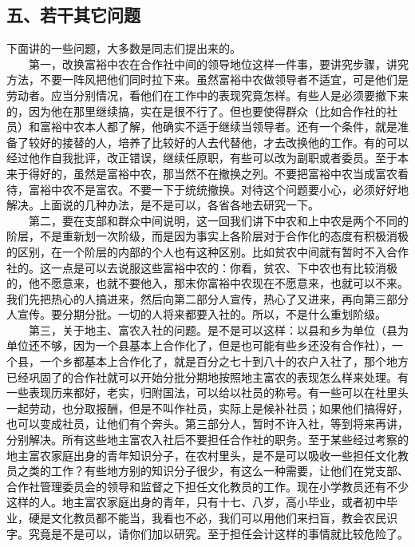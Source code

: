 \documentclass[cn,11pt,chinese]{elegantbook}
\def\myformat#1{\hfil\hfil #1}
\begin{document}
\subsection*{\myformat{五、若干其它问题}}
下面讲的一些问题，大多数是同志们提出来的。\\
　　第一，改换富裕中农在合作社中间的领导地位这样一件事，要讲究步骤，讲究方法，不要一阵风把他们同时拉下来。虽然富裕中农做领导者不适宜，可是他们是劳动者。应当分别情况，看他们在工作中的表现究竟怎样。有些人是必须要撤下来的，因为他在那里继续搞，实在是很不行了。但也要使得群众（比如合作社的社员）和富裕中农本人都了解，他确实不适于继续当领导者。还有一个条件，就是准备了较好的接替的人，培养了比较好的人去代替他，才去改换他的工作。有的可以经过他作自我批评，改正错误，继续任原职，有些可以改为副职或者委员。至于本来于得好的，虽然是富裕中农，那当然不在撤换之列。不要把富裕中农当成富农看待，富裕中农不是富农。不要一下于统统撤换。对待这个问题要小心，必须好好地解决。上面说的几种办法，是不是可以，各省各地去研究一下。\\
　　第二，要在支部和群众中间说明，这一回我们讲下中农和上中农是两个不同的阶层，不是重新划一次阶级，而是因为事实上各阶层对于合作化的态度有积极消极的区别，在一个阶层的内部的个人也有这种区别。比如贫农中间就有暂时不入合作社的。这一点是可以去说服这些富裕中农的：你看，贫农、下中农也有比较消极的，他不愿意来，也就不要他入，那末你富裕中农现在不愿意来，也就可以不来。我们先把热心的人搞进来，然后向第二部分人宣传，热心了又进来，再向第三部分人宣传。要分期分批。一切的人将来都要入社的。所以，不是什么重划阶级。\\
　　第三，关于地主、富农入社的问题。是不是可以这样：以县和乡为单位（县为单位还不够，因为一个县基本上合作化了，但是也可能有些乡还没有合作社），一个县，一个乡都基本上合作化了，就是百分之七十到八十的农户入社了，那个地方已经巩固了的合作社就可以开始分批分期地按照地主富农的表现怎么样来处理。有一些表现历来都好，老实，归附国法，可以给以社员的称号。有一些可以在社里头一起劳动，也分取报酬，但是不叫作社员，实际上是候补社员；如果他们搞得好，也可以变成社员，让他们有个奔头。第三部分人，暂时不许入社，等到将来再讲，分别解决。所有这些地主富农入社后不要担任合作社的职务。至于某些经过考察的地主富农家庭出身的青年知识分子，在农村里头，是不是可以吸收一些担任文化教员之类的工作？有些地方别的知识分子很少，有这么一种需要，让他们在党支部、合作社管理委员会的领导和监督之下担任文化教员的工作。现在小学教员还有不少这样的人。地主富农家庭出身的青年，只有十七、八岁，高小毕业，或者初中毕业，硬是文化教员都不能当，我看也不必，我们可以用他们来扫盲，教会农民识字。究竟是不是可以，请你们加以研究。至于担任会计这样的事情就比较危险了。\\
\end{document}
